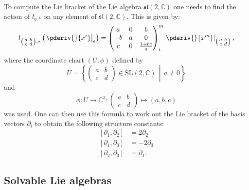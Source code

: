     \begin{example}
        To compute the Lie bracket of the Lie algebra $\mathfrak{sl}(2, \mathbb{C})$ one needs to find the action of $l_{g,*}$ on any element of $\mathfrak{sl}(2,\mathbb{C})$. This is given by:
        \begin{gather}
            l_{\left(\begin{smallmatrix}a&b\\c&d\end{smallmatrix}\right), *}\left(\left.\pderiv{}{x^i}\right|_e\right)
            = \begin{pmatrix}a&0&b\\-b&a&0\\c&0&\frac{1+bc}{a}\end{pmatrix}^m_i\left.\pderiv{}{x^m}\right|_{\left(\begin{smallmatrix}a&b\\c&d\end{smallmatrix}\right)},
        \end{gather}
        where the coordinate chart $(U,\phi)$ defined by \[U = \left\{\begin{pmatrix}a&b\\c&d\end{pmatrix}\in\mathrm{SL}(2, \mathbb{C})\,\middle\vert\,a\neq0\right\}\] and \[\phi:U\rightarrow\mathbb{C}^3:\begin{pmatrix}a&b\\c&d\end{pmatrix}\mapsto(a,b,c)\] was used. One can then use this formula to work out the Lie bracket of the basis vectors $\partial_i$ to obtain the following structure constants:
        \begin{align}
            \label{lie:sl2c_lie_brackets}
            [\partial_1,\partial_2] &= 2\partial_2\nonumber\\
            [\partial_1,\partial_3] &= -2\partial_3\\
            [\partial_2,\partial_3] &= \partial_1.\nonumber
        \end{align}
    \end{example}

\subsection{Solvable Lie algebras}


